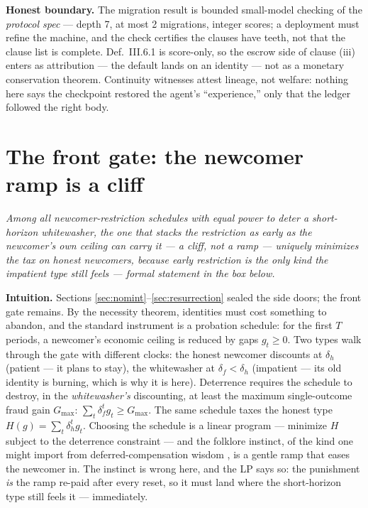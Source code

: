 \documentclass[11pt,a4paper]{article}
\newcommand{\onebreath}[1]{\begin{center}\emph{#1}\end{center}}
\begin{document}
\begin{boundary}
\textbf{Honest boundary.} The migration result is bounded small-model checking of the \emph{protocol spec} --- depth 7, at most 2
migrations, integer scores; a deployment must refine the machine, and the check certifies the clauses have teeth, not that the
clause list is complete. Def.~III.6.1 is score-only, so the escrow side of clause (iii) enters as attribution --- the default lands
on an identity --- not as a monetary conservation theorem. Continuity witnesses attest lineage, not welfare: nothing here says the
checkpoint restored the agent's ``experience,'' only that the ledger followed the right body.
\end{boundary}

\section{The front gate: the newcomer ramp is a cliff}\label{sec:cliff}

\onebreath{Among all newcomer-restriction schedules with equal power to deter a short-horizon whitewasher, the one that stacks the
restriction as early as the newcomer's own ceiling can carry it --- a cliff, not a ramp --- uniquely minimizes the tax on honest
newcomers, because early restriction is the only kind the impatient type still feels --- formal statement in the box below.}

\textbf{Intuition.} Sections \ref{sec:nomint}--\ref{sec:resurrection} sealed the side doors; the front gate remains. By the
necessity theorem, identities must cost something to abandon, and the standard instrument is a probation schedule: for the first
$T$ periods, a newcomer's economic ceiling is reduced by gaps $g_t\ge 0$. Two types walk through the gate with different clocks:
the honest newcomer discounts at $\delta_h$ (patient --- it plans to stay), the whitewasher at $\delta_f<\delta_h$ (impatient ---
its old identity is burning, which is why it is here). Deterrence requires the schedule to destroy, in the \emph{whitewasher's}
discounting, at least the maximum single-outcome fraud gain $G_{\max}$: $\sum_t\delta_f^t g_t\ge G_{\max}$. The same schedule taxes
the honest type $H(g)=\sum_t\delta_h^t g_t$. Choosing the schedule is a linear program --- minimize $H$ subject to the deterrence
constraint --- and the folklore instinct, of the kind one might import from deferred-compensation wisdom \cite{lazear}, is a
gentle ramp that eases the newcomer in. The instinct is wrong here, and the LP says so: the punishment \emph{is} the ramp re-paid after every reset,
so it must land where the short-horizon type still feels it --- immediately.
\end{document}
